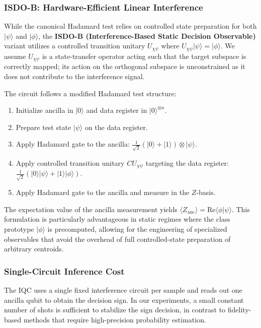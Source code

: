 \documentclass[conference]{IEEEtran}
\begin{document}
\subsubsection{ISDO-B: Hardware-Efficient Linear Interference}
While the canonical Hadamard test relies on controlled state preparation for both $|\psi\rangle$ and $|\phi\rangle$, the \textbf{ISDO-B (Interference-Based Static Decision Observable)} variant utilizes a controlled transition unitary $U_{\chi\psi}$ where $U_{\chi\psi}|\psi\rangle = |\phi\rangle$. We assume $U_{\chi\psi}$ is a state-transfer operator acting such that the target subspace is correctly mapped; its action on the orthogonal subspace is unconstrained as it does not contribute to the interference signal.

The circuit follows a modified Hadamard test structure:
\begin{enumerate}
    \item Initialize ancilla in $|0\rangle$ and data register in $|0\rangle^{\otimes n}$.
    \item Prepare test state $|\psi\rangle$ on the data register.
    \item Apply Hadamard gate to the ancilla: $\frac{1}{\sqrt{2}}(|0\rangle+|1\rangle) \otimes |\psi\rangle$.
    \item Apply controlled transition unitary $CU_{\chi\psi}$ targeting the data register: $\frac{1}{\sqrt{2}}(|0\rangle |\psi\rangle + |1\rangle |\phi\rangle)$.
    \item Apply Hadamard gate to the ancilla and measure in the $Z$-basis.
\end{enumerate}
The expectation value of the ancilla measurement yields $\langle Z_{\text{anc}} \rangle = \mathrm{Re}\langle \phi | \psi \rangle$. This formulation is particularly advantageous in static regimes where the class prototype $|\phi\rangle$ is precomputed, allowing for the engineering of specialized observables that avoid the overhead of full controlled-state preparation of arbitrary centroids.

\subsubsection{Single-Circuit Inference Cost}
The IQC uses a single fixed interference circuit per sample and reads out one ancilla qubit to obtain the decision sign. In our experiments, a small constant number of shots is sufficient to stabilize the sign decision, in contrast to fidelity-based methods that require high-precision probability estimation.
\end{document}
